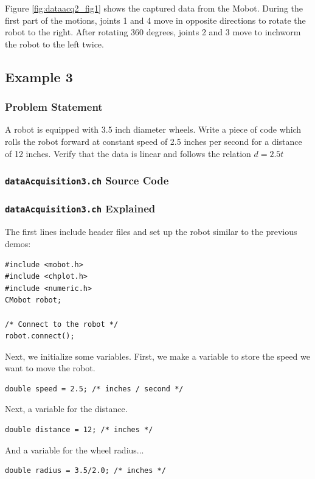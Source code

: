 \documentclass{article}
\begin{document}
Figure \ref{fig:dataacq2_fig1} shows the captured data from the Mobot. During the first
part of the motions, joints 1 and 4 move in opposite directions to rotate the robot to
the right. After rotating 360 degrees, joints 2 and 3 move to inchworm the robot to the
left twice.

\subsection{Example 3}
\subsubsection{Problem Statement}
A robot is equipped with 3.5 inch diameter wheels. Write a piece of code which rolls the
robot forward at constant speed of 2.5 inches per second for a distance of 12 inches. 
Verify that the data is linear and follows the relation $d = 2.5t$

\subsubsection{\texttt{dataAcquisition3.ch} Source Code}


\subsubsection{\texttt{dataAcquisition3.ch} Explained}
The first lines include header files and set up the robot similar to the previous
demos:
\begin{verbatim}
#include <mobot.h>
#include <chplot.h>
#include <numeric.h>
CMobot robot;

/* Connect to the robot */
robot.connect();
\end{verbatim}

Next, we initialize some variables. First, we make a variable to store the speed
we want to move the robot.
\begin{verbatim}
double speed = 2.5; /* inches / second */
\end{verbatim}

Next, a variable for the distance.
\begin{verbatim}
double distance = 12; /* inches */
\end{verbatim}

And a variable for the wheel radius...
\begin{verbatim}
double radius = 3.5/2.0; /* inches */
\end{verbatim}
\end{document}
